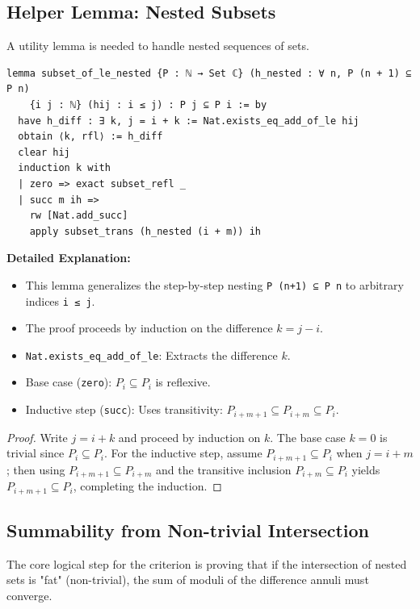 \subsection{Helper Lemma: Nested Subsets}

A utility lemma is needed to handle nested sequences of sets.

\begin{lstlisting}[language=Lean]
lemma subset_of_le_nested {P : ℕ → Set ℂ} (h_nested : ∀ n, P (n + 1) ⊆ P n)
    {i j : ℕ} (hij : i ≤ j) : P j ⊆ P i := by
  have h_diff : ∃ k, j = i + k := Nat.exists_eq_add_of_le hij
  obtain ⟨k, rfl⟩ := h_diff
  clear hij
  induction k with
  | zero => exact subset_refl _
  | succ m ih =>
    rw [Nat.add_succ]
    apply subset_trans (h_nested (i + m)) ih
\end{lstlisting}

\noindent
\textbf{Detailed Explanation:}
\begin{itemize}
    \item This lemma generalizes the step-by-step nesting \texttt{P (n+1) ⊆ P n} to arbitrary indices \texttt{i ≤ j}.
    \item The proof proceeds by induction on the difference $k = j - i$.
    \item \texttt{Nat.exists\_eq\_add\_of\_le}: Extracts the difference $k$.
    \item Base case (\texttt{zero}): $P_i \subseteq P_i$ is reflexive.
    \item Inductive step (\texttt{succ}): Uses transitivity: $P_{i+m+1} \subseteq P_{i+m} \subseteq P_i$.
\end{itemize}

\begin{proof}
Write $j=i+k$ and proceed by induction on $k$. The base case $k=0$ is trivial since $P_i\subseteq P_i$. For the inductive step, assume $P_{i+m+1}\subseteq P_i$ when $j=i+m$; then using $P_{i+m+1}\subseteq P_{i+m}$ and the transitive inclusion $P_{i+m}\subseteq P_i$ yields $P_{i+m+1}\subseteq P_i$, completing the induction.
\end{proof}

\subsection{Summability from Non-trivial Intersection}

The core logical step for the criterion is proving that if the intersection of nested sets is "fat" (non-trivial), the sum of moduli of the difference annuli must converge.

